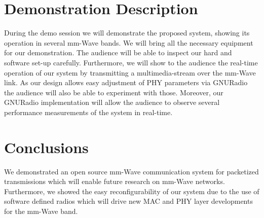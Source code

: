 \documentclass{acm_proc_article-sp}
\begin{document}
\section{Demonstration Description} 
During the demo session we will demonstrate the proposed system, showing its operation in several mm-Wave bands. We will bring all the necessary equipment for our demonstration. The audience will be able to inspect our hard and software set-up carefully. Furthermore, we will show to the audience the real-time operation of our system by transmitting a multimedia-stream over the mm-Wave link. As our design allows easy adjustment of PHY parameters via GNURadio the audience will also be able to experiment with those. Moreover, our GNURadio implementation will allow the audience to observe several performance measurements of the system in real-time.

\section{Conclusions}
We demonstrated an open source mm-Wave communication system for packetized transmissions which will enable future research on mm-Wave networks. Furthermore, we showed the easy reconfigurability of our system due to the use of software defined radios which will drive new MAC and PHY layer developments for the mm-Wave band.




\balancecolumns
\end{document}
